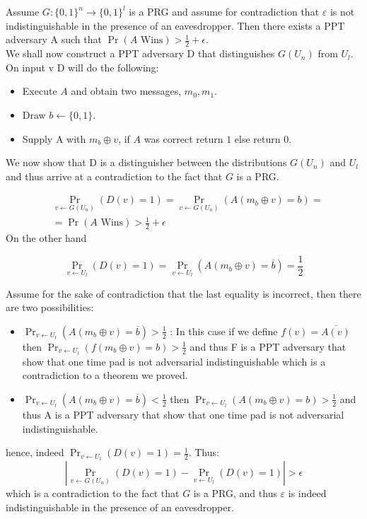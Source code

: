 \documentclass{article}
\begin{document}
\section{}
Assume $G:\{0,1\}^n \rightarrow \{0,1\}^l$ is a PRG and assume for contradiction that $\varepsilon$ is not indistinguishable in the presence of an eavesdropper. Then there exists a PPT adversary A such that $\Pr(A \mbox{ Wins}) > \frac{1}{2} + \epsilon$.\\
We shall now construct a PPT adversary D that distinguishes $G(U_n)$ from $U_l$.
On input v D will do the following:
\begin{itemize}
\item Execute $A$ and obtain two messages, $m_0, m_1$.
\item Draw $b \leftarrow \{0, 1\}$.
\item Supply A with $m_b \oplus v$, if $A$ was correct return $1$ else return $0$.
\end{itemize}
We now show that D is a distinguisher between the distributions $G(U_n)$ and $U_l$ and thus arrive at a contradiction to the fact that $G$ is a PRG.

\begin{align*}
&\Pr_{v \leftarrow G(U_n)}(D(v) = 1) = \Pr_{v \leftarrow G(U_n)}(A(m_b \oplus v) = b) =\\
&= \Pr(A \mbox{ Wins}) > \frac{1}{2} + \epsilon
\end{align*}
On the other hand 

\[\Pr_{ v \leftarrow U_l}(D(v) = 1) = \Pr_{ v \leftarrow U_l}(A(m_b \oplus v) = \overline{b}) = \frac{1}{2}\]

Assume for the sake of contradiction that the last equality is incorrect, then there are two possibilities:
\begin{itemize}
\item $\Pr_{ v \leftarrow U_l}(A(m_b \oplus v) = \overline{b} ) > \frac{1}{2}$ : In this case if we define $f(v) = \overline{A(v)}$ then 
$\Pr_{ v \leftarrow U_l}(f(m_b \oplus v) = b) > \frac{1}{2}$ and thus F is a PPT adversary that show that one time pad is not adversarial indistinguishable
which is a contradiction to a theorem we proved.
\item $\Pr_{ v \leftarrow U_l}(A(m_b \oplus v) = \overline{b}) < \frac{1}{2}$ then  $\Pr_{ v \leftarrow U_l}(A(m_b \oplus v) = b) > \frac{1}{2}$ and thus A is a PPT adversary that show that one time pad is not adversarial indistinguishable.
\end{itemize}

hence, indeed $\Pr_{ v \leftarrow U_l}(D(v) = 1) = \frac{1}{2}$.
Thus:
\[|\Pr_{v \leftarrow G(U_n)}(D(v) = 1) - \Pr_{ v \leftarrow U_l}(D(v) = 1)| > \epsilon\]
which is a contradiction to the fact that $G$ is a PRG, and thus $\varepsilon$ is indeed indistinguishable in the presence of an eavesdropper.
\end{document}
